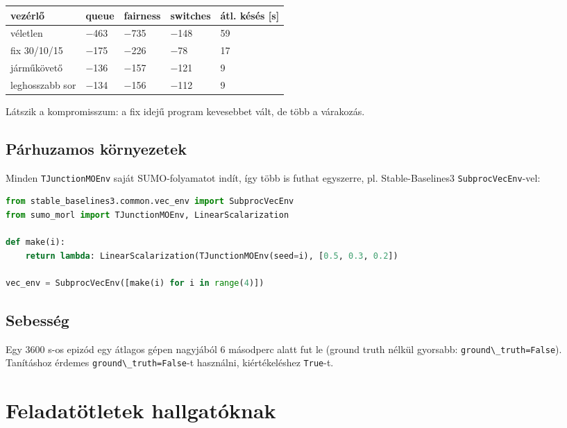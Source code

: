 \begin{longtable}[]{@{}lllll@{}}
\toprule\noalign{}
vezérlő & queue & fairness & switches &
átl. késés {[}s{]} \\
\midrule\noalign{}
\endhead
\bottomrule\noalign{}
\endlastfoot
véletlen & −463 & −735 & −148 & 59 \\
fix 30/10/15 & −175 & −226 & −78 & 17 \\
járműkövető & −136 & −157 & −121 & 9 \\
leghosszabb sor & −134 & −156 & −112 &
9 \\
\end{longtable}

Látszik a kompromisszum: a fix idejű
program kevesebbet vált, de több a
várakozás.

\hypertarget{puxe1rhuzamos-kuxf6rnyezetek}{%
\subsection{Párhuzamos
környezetek}\label{puxe1rhuzamos-kuxf6rnyezetek}}

Minden
\passthrough{\lstinline!TJunctionMOEnv!}
saját SUMO-folyamatot indít, így több is
futhat egyszerre, pl. Stable-Baselines3
\passthrough{\lstinline!SubprocVecEnv!}-vel:

\begin{lstlisting}[language=Python]
from stable_baselines3.common.vec_env import SubprocVecEnv
from sumo_morl import TJunctionMOEnv, LinearScalarization

def make(i):
    return lambda: LinearScalarization(TJunctionMOEnv(seed=i), [0.5, 0.3, 0.2])

vec_env = SubprocVecEnv([make(i) for i in range(4)])
\end{lstlisting}

\hypertarget{sebessuxe9g}{%
\subsection{Sebesség}\label{sebessuxe9g}}

Egy 3600 s-os epizód egy átlagos gépen
nagyjából 6 másodperc alatt fut le
(ground truth nélkül gyorsabb:
\passthrough{\lstinline!ground\_truth=False!}).
Tanításhoz érdemes
\passthrough{\lstinline!ground\_truth=False!}-t
használni, kiértékeléshez
\passthrough{\lstinline!True!}-t.


\hypertarget{feladatuxf6tletek-hallgatuxf3knak}{%
\section{Feladatötletek
hallgatóknak}\label{feladatuxf6tletek-hallgatuxf3knak}}

